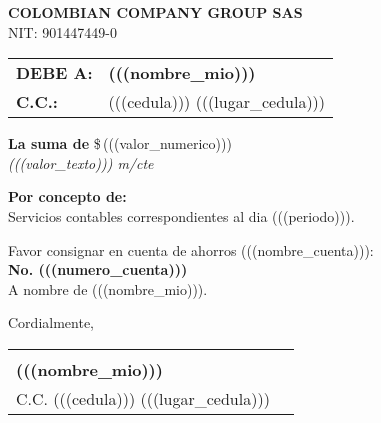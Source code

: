 \documentclass[11pt,a4paper]{article}
\begin{document}
\vspace*{1cm}

\begin{center}
  {\LARGE\bfseries COLOMBIAN COMPANY GROUP SAS}\\[4pt]
  {\small\scshape NIT: 901447449-0}
\end{center}

\vspace{1cm}

\noindent
\begin{tabular}{@{}p{} p{}@{}}
\textbf{DEBE A:} & \textbf{(((nombre_mio)))} \\
\textbf{C.C.:}   & (((cedula))) (((lugar_cedula))) \\[6pt]
\end{tabular}

\vspace{0.8cm}

\begin{mdframed}[style=amountbox]
  \textbf{La suma de} \hfill {\LARGE \$\,(((valor_numerico)))} \\
  \textit{(((valor_texto))) m/cte}
\end{mdframed}


\vspace{0.8cm}

\noindent
\textbf{Por concepto de:}\\
Servicios contables correspondientes al dia (((periodo))).

\vspace{1cm}

\noindent
\begin{minipage}{0.6\textwidth}
  Favor consignar en cuenta de ahorros (((nombre_cuenta))):\\
  \textbf{No. (((numero_cuenta)))}\\
  A nombre de (((nombre_mio))).
\end{minipage}

\hfill

\vspace{2cm}

\noindent
Cordialmente,\\[1.5cm]
\noindent
\begin{tabular}{@{}p{6.5cm}@{}p{6.5cm}@{}}
\cline{1-1}
 & \\
\textbf{(((nombre_mio)))} & \\
C.C. (((cedula))) (((lugar_cedula))) &
\end{tabular}
\end{document}
